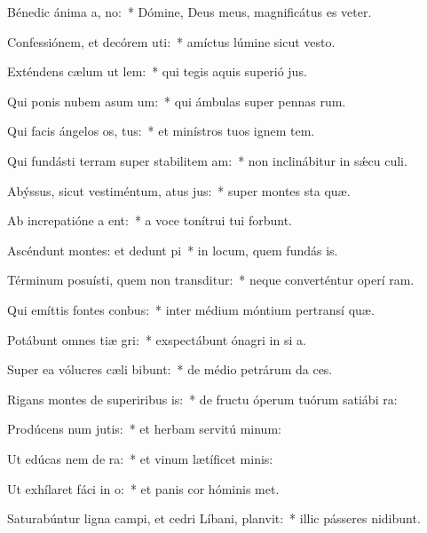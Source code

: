 \item Bénedic ánima a, no:~* Dómine, Deus meus, magnificátus es veter.
\item Confessiónem, et decórem uti:~* amíctus lúmine sicut vesto.
\item Exténdens cælum ut lem:~* qui tegis aquis superió jus.
\item Qui ponis nubem asum um:~* qui ámbulas super pennas rum.
\item Qui facis ángelos os, tus:~* et minístros tuos ignem tem.
\item Qui fundásti terram super stabilitem am:~* non inclinábitur in sǽcu culi.
\item Abýssus, sicut vestiméntum, atus jus:~* super montes sta quæ.
\item Ab increpatióne a ent:~* a voce tonítrui tui forbunt.
\item Ascéndunt montes: et dedunt pi~* in locum, quem fundás is.
\item Términum posuísti, quem non transditur:~* neque converténtur operí ram.
\item Qui emíttis fontes  conbus:~* inter médium móntium pertransí quæ.
\item Potábunt omnes tiæ gri:~* exspectábunt ónagri in si a.
\item Super ea vólucres cæli bibunt:~* de médio petrárum da ces.
\item Rigans montes de superiribus is:~* de fructu óperum tuórum satiábi ra:
\item Prodúcens num jutis:~* et herbam servitú minum:
\item Ut edúcas nem de ra:~* et vinum lætíficet  minis:
\item Ut exhílaret fáci in o:~* et panis cor hóminis met.
\item Saturabúntur ligna campi, et cedri Líbani,  planvit:~* illic pásseres nidibunt.
